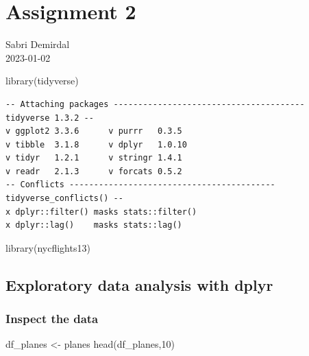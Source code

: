 \documentclass[
  letterpaper,
  DIV=11,
  numbers=noendperiod]{scrreprt}
\newenvironment{Shaded}{\begin{snugshade}}{\end{snugshade}}
\newcommand{\DecValTok}[1]{\textcolor[rgb]{0.68,0.00,0.00}{#1}}
\newcommand{\FunctionTok}[1]{\textcolor[rgb]{0.28,0.35,0.67}{#1}}
\newcommand{\NormalTok}[1]{\textcolor[rgb]{0.00,0.23,0.31}{#1}}
\newcommand{\OtherTok}[1]{\textcolor[rgb]{0.00,0.23,0.31}{#1}}
\begin{document}

\hypertarget{assignment-2}{%
\chapter{Assignment 2}\label{assignment-2}}

Sabri Demirdal\\
2023-01-02

\hfill\break

\begin{Shaded}
\begin{Highlighting}[]
\FunctionTok{library}\NormalTok{(tidyverse)}
\end{Highlighting}
\end{Shaded}

\begin{verbatim}
-- Attaching packages --------------------------------------- tidyverse 1.3.2 --
v ggplot2 3.3.6      v purrr   0.3.5 
v tibble  3.1.8      v dplyr   1.0.10
v tidyr   1.2.1      v stringr 1.4.1 
v readr   2.1.3      v forcats 0.5.2 
-- Conflicts ------------------------------------------ tidyverse_conflicts() --
x dplyr::filter() masks stats::filter()
x dplyr::lag()    masks stats::lag()
\end{verbatim}

\begin{Shaded}
\begin{Highlighting}[]
\FunctionTok{library}\NormalTok{(nycflights13)}
\end{Highlighting}
\end{Shaded}

\hypertarget{exploratory-data-analysis-with-dplyr}{%
\section{Exploratory data analysis with
dplyr}\label{exploratory-data-analysis-with-dplyr}}

\hypertarget{inspect-the-data}{%
\subsection{Inspect the data}\label{inspect-the-data}}

\begin{Shaded}
\begin{Highlighting}[]
\NormalTok{df\_planes }\OtherTok{\textless{}{-}}\NormalTok{ planes}
\FunctionTok{head}\NormalTok{(df\_planes,}\DecValTok{10}\NormalTok{)}
\end{Highlighting}
\end{Shaded}
\end{document}
